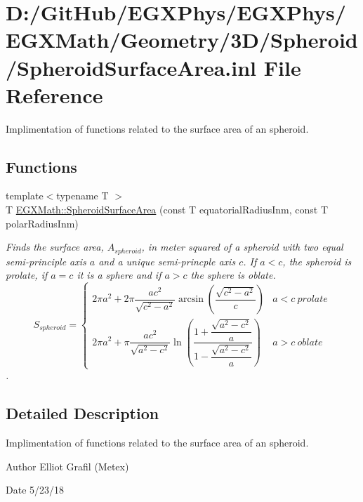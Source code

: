 \hypertarget{_spheroid_surface_area_8inl}{}\section{D\+:/\+Git\+Hub/\+E\+G\+X\+Phys/\+E\+G\+X\+Phys/\+E\+G\+X\+Math/\+Geometry/3\+D/\+Spheroid/\+Spheroid\+Surface\+Area.inl File Reference}
\label{_spheroid_surface_area_8inl}


Implimentation of functions related to the surface area of an spheroid.  


\subsection*{Functions}
\begin{DoxyCompactItemize}
\item 
{\footnotesize template$<$typename T $>$ }\\T \mbox{\hyperlink{group___e_g_x_math-_geometry-3_d-_spheroid-_surface_area_ga5a3580e7ded82cb678a558905f41ae49}{E\+G\+X\+Math\+::\+Spheroid\+Surface\+Area}} (const T equatorial\+Radius\+Inm, const T polar\+Radius\+Inm)
\begin{DoxyCompactList}\small\item\em Finds the surface area, $A_{spheroid}$, in meter squared of a spheroid with two equal semi-\/principle axis $a$ and a unique semi-\/princple axis $c$. If $a < c$, the spheroid is prolate, if $a = c$ it is a sphere and if $a>c$ the sphere is oblate. \[ S_{spheroid}=\begin{cases} 2\pi a^2 + 2\pi\dfrac{a c^2}{\sqrt{c^2-a^2}}\arcsin \left ( \dfrac{\sqrt{c^2-a^2}}{c} \right ) & a<c\ prolate \\ 2\pi a^2 +\pi \dfrac{a c^2}{\sqrt{a^2-c^2}}\ln \left(\dfrac{1+\dfrac{\sqrt{a^2-c^2}}{a}}{1-\dfrac{\sqrt{a^2-c^2}}{a}}\right )& a>c\ oblate \end{cases} \]. \end{DoxyCompactList}\end{DoxyCompactItemize}


\subsection{Detailed Description}
Implimentation of functions related to the surface area of an spheroid. 

\begin{DoxyAuthor}{Author}
Elliot Grafil (Metex) 
\end{DoxyAuthor}
\begin{DoxyDate}{Date}
5/23/18 
\end{DoxyDate}
